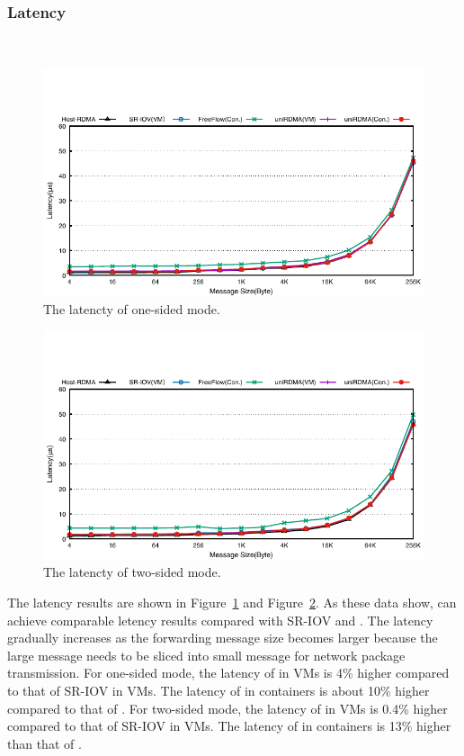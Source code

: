 \subsubsection{\textbf{Latency}}
\
\noindent

\begin{figure}[!ht]
	\centering
	\includegraphics[width=1.00\linewidth]{images/write-lat.pdf}
	\caption{The latencty of one-sided mode.}
	\label{fig:write-lat}
\end{figure}


\begin{figure}[!ht]
	\centering
	\includegraphics[width=1.00\linewidth]{images/send-lat.pdf}
	\caption{The latencty of two-sided mode.}
	\label{fig:send-lat}
\end{figure}


The latency results are shown in Figure~\ref{fig:write-lat} and Figure~\ref{fig:send-lat}. As these data show, \sys can achieve comparable letency results compared with SR-IOV and \native. The latency gradually increases as the forwarding message size becomes larger because the large message needs to be sliced into small message for network package transmission.
For one-sided mode, the latency of \sys in VMs is 4\% higher compared to that of SR-IOV in VMs. The latency of \sys in containers is about 10\% higher compared to that of \native. For two-sided mode, the latency of \sys in VMs is 0.4\% higher compared to that of SR-IOV in VMs. The latency of \sys in containers is 13\% higher than that of \native.

